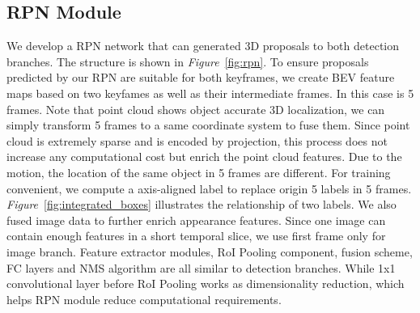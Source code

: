 \documentclass[letterpaper, 10 pt, conference]{ieeeconf}  %
\def\figurename{\emph{Figure}}
\begin{document}
\subsection{RPN Module}

We develop a RPN network that can generated 3D proposals to both detection branches. The structure is shown in \figurename \, \ref{fig:rpn}. To ensure proposals predicted by our RPN are suitable for both keyframes, we create BEV feature maps based on two keyfames as well as their intermediate frames. In this case is 5 frames. Note that point cloud shows object accurate 3D localization, we can simply transform 5 frames to a same coordinate system to fuse them. Since point cloud is extremely sparse and is encoded by projection, this process does not increase any computational cost but enrich the point cloud features. Due to the motion, the location of the same object in 5 frames are different. For training convenient, we compute a axis-aligned label to replace origin 5 labels in 5 frames. \figurename \, \ref{fig:integrated_boxes} illustrates the relationship of two labels. We also fused image data to further enrich appearance features. Since one image can contain enough features in a short temporal slice, we use first frame only for image branch. Feature extractor modules, RoI Pooling component, fusion scheme, FC layers and NMS algorithm are all similar to detection branches. While 1x1 convolutional layer before RoI Pooling works as dimensionality reduction, which helps RPN module reduce computational requirements.
\end{document}
